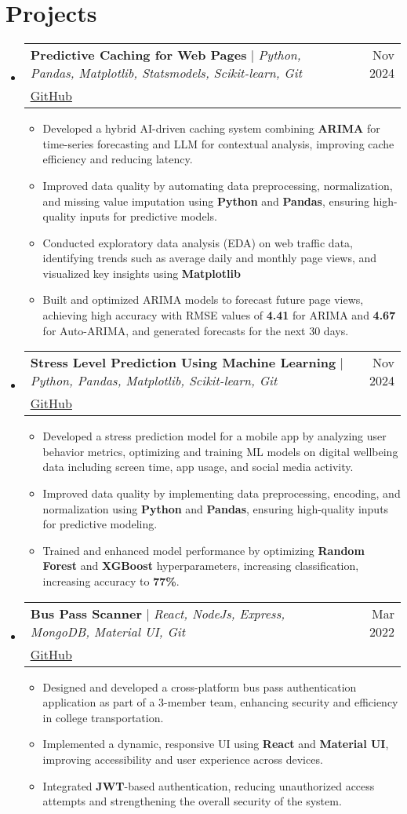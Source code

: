 \documentclass[letterpaper,11pt]{article}
\makeatletter
\newcommand{\resumeItem}[1]{
  \item\small{
    {#1 \vspace{-2pt}}
  }
}
\newcommand{\resumeProjectHeading}[3]{
    \item
    \begin{tabular*}{0.97\textwidth}{l@{\extracolsep{\fill}}r}
      \small#1 & #2 \\
      \multicolumn{2}{l}{\footnotesize#3} \\
    \end{tabular*}\vspace{-7pt}
}
\newcommand{\resumeSubHeadingListStart}{\begin{itemize}[leftmargin=0.15in, label={}]}
\newcommand{\resumeSubHeadingListEnd}{\end{itemize}}
\newcommand{\resumeItemListStart}{\begin{itemize}}
\newcommand{\resumeItemListEnd}{\end{itemize}\vspace{-5pt}}
\makeatother
\begin{document}
\section{Projects}
    \resumeSubHeadingListStart
          \resumeProjectHeading
          {\textbf{Predictive Caching for Web Pages} $|$ \emph{Python, Pandas, Matplotlib, Statsmodels, Scikit-learn, Git}}{Nov 2024}
          {\href{https://github.com/sharansukesh1003/COMP-8157-Final-Project}{\underline{GitHub}}}
          \resumeItemListStart
            \resumeItem{Developed a hybrid AI-driven caching system combining \textbf{ARIMA} for time-series forecasting and LLM for contextual analysis, improving cache efficiency and reducing latency.}
            \resumeItem{Improved data quality by automating data preprocessing, normalization, and missing value imputation using \textbf{Python} and \textbf{Pandas}, ensuring high-quality inputs for predictive models.}
            \resumeItem{Conducted exploratory data analysis (EDA) on web traffic data, identifying trends such as average daily and monthly page views, and visualized key insights using \textbf{Matplotlib}}
            \resumeItem{Built and optimized ARIMA models to forecast future page views, achieving high accuracy with RMSE values of \textbf{4.41} for ARIMA and \textbf{4.67} for Auto-ARIMA, and generated forecasts for the next 30 days.}
          \resumeItemListEnd
          \resumeProjectHeading
          {\textbf{Stress Level Prediction Using Machine Learning} $|$ \emph{Python, Pandas, Matplotlib, Scikit-learn, Git}}{Nov 2024}
          {\href{https://github.com/aaryen-dsouza/stress-prediction-ml}{\underline{GitHub}}}
          \resumeItemListStart
            \resumeItem{Developed a stress prediction model for a mobile app by analyzing user behavior metrics, optimizing and training ML models on digital wellbeing data including screen time, app usage, and social media activity.}
            \resumeItem{Improved data quality by implementing data preprocessing, encoding, and normalization using \textbf{Python} and \textbf{Pandas}, ensuring high-quality inputs for predictive modeling.}
            \resumeItem{Trained and enhanced model performance by optimizing \textbf{Random Forest} and \textbf{XGBoost} hyperparameters, increasing classification, increasing accuracy to \textbf{77\%}.}
          \resumeItemListEnd
          \resumeProjectHeading
          {\textbf{Bus Pass Scanner} $|$ \emph{React, NodeJs, Express, MongoDB, Material UI, Git}}{Mar 2022}
          {\href{https://github.com/aaryen-dsouza/BusPass_Scanner}{\underline{GitHub}}}
          \resumeItemListStart
            \resumeItem{Designed and developed a cross-platform bus pass authentication application as part of a 3-member team, enhancing security and efficiency in college transportation.}
            \resumeItem{Implemented a dynamic, responsive UI using \textbf{React} and \textbf{Material UI}, improving accessibility and user experience across devices.}
            \resumeItem{Integrated \textbf{JWT}-based authentication, reducing unauthorized access attempts and strengthening the overall security of the system.}
          \resumeItemListEnd
    \resumeSubHeadingListEnd
\end{document}
